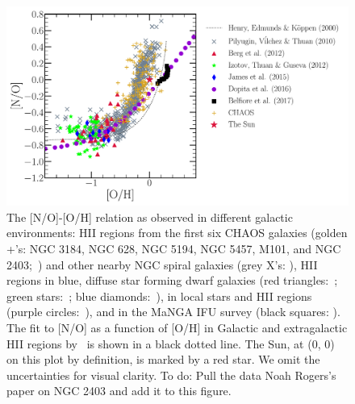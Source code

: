 \documentclass[ms.tex]{subfiles}
\begin{document}
\begin{figure} 
\centering 
\includegraphics[scale = 0.5]{no_oh_observed.pdf} 
\caption{
The [N/O]-[O/H] relation as observed in different galactic environments:
HII regions from the first six CHAOS galaxies (golden +'s: NGC 3184, NGC 628, 
NGC 5194, NGC 5457, M101, and NGC 2403;~\citealp{Berg2020, Skillman2020,
Rogers2021}) and other nearby NGC spiral galaxies (grey X's:
\citealp*{Pilyugin2010}), HII regions in blue, diffuse star forming dwarf
galaxies (red triangles:~\citealp{Berg2012}; green stars:~\citealp*{Izotov2012};
blue diamonds:~\citealp{James2015}), in local stars and HII regions (purple
circles:~\citealp{Dopita2016}), and in the MaNGA IFU survey (black squares:
\citealp{Belfiore2017}).
The fit to [N/O] as a function of [O/H] in Galactic and extragalactic HII 
regions by~\citet*{Henry2000} is shown in a black dotted line. 
The Sun, at (0, 0) on this plot by definition, is marked by a red star. 
We omit the uncertainties for visual clarity. 
{\color{red} To do: Pull the data Noah Rogers's paper on NGC 2403 and add it
to this figure.
} 
} 
\label{fig:no_oh_observed} 
\end{figure} 
\end{document}
